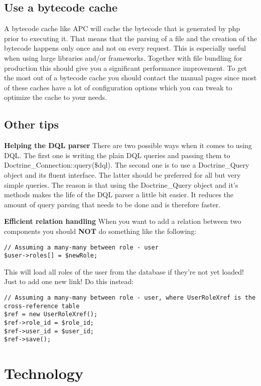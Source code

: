 \documentclass[11pt,a4paper]{report}
\begin{document}
\section{Use a bytecode cache}
A bytecode cache like APC will cache the bytecode that is generated by php prior to executing it. That means that the parsing of a file and the creation of the bytecode happens only once and not on every request. This is especially useful when using large libraries and/or frameworks. Together with file bundling for production this should give you a significant performance improvement. To get the most out of a bytecode cache you should contact the manual pages since most of these caches have a lot of configuration options which you can tweak to optimize the cache to your needs.

\section{Other tips}
\textbf{Helping the DQL parser}\newline
There are two possible ways when it comes to using DQL. The first one is writing the plain DQL queries and passing them to Doctrine\_Connection::query(\$dql). The second one is to use a Doctrine\_Query object and its fluent interface. The latter should be preferred for all but very simple queries. The reason is that using the Doctrine\_Query object and it's methods makes the life of the DQL parser a little bit easier. It reduces the amount of query parsing that needs to be done and is therefore faster.

\textbf{Efficient relation handling}\newline
When you want to add a relation between two components you should \textbf{NOT} do something like the following:

\begin{verbatim}
// Assuming a many-many between role - user
$user->roles[] = $newRole;
\end{verbatim}

 This will load all roles of the user from the database if they're not yet loaded! Just to add one new link! Do this instead:

\begin{verbatim}
// Assuming a many-many between role - user, where UserRoleXref is the cross-reference table
$ref = new UserRoleXref();
$ref->role_id = $role_id;
$ref->user_id = $user_id;
$ref->save();
\end{verbatim}

\chapter{Technology}
\end{document}

